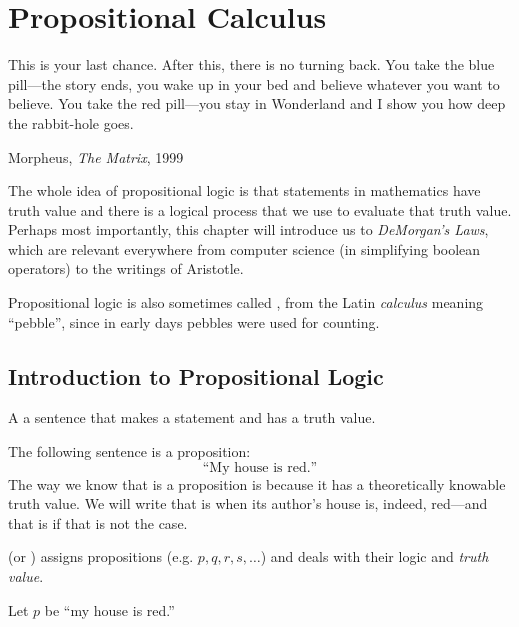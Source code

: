\chapter{Propositional Calculus}
\epigraph{This is your last chance. After this, there is no turning back. You
take the blue pill---the story ends, you wake up in your bed and believe
whatever you want to believe. You take the red pill---you stay in Wonderland and
I show you how deep the rabbit-hole goes.}{Morpheus, \emph{The Matrix}, 1999}
\label{ch:propositional}

The whole idea of propositional logic is that statements in mathematics have truth value and there is a logical process that we use to evaluate that truth value.
Perhaps most importantly, this chapter will introduce us to \emph{DeMorgan's Laws}, which are relevant everywhere from computer science (in simplifying boolean operators) to the writings of Aristotle.

\begin{remark}
Propositional logic is also sometimes called
,
from the Latin \emph{calculus} meaning ``pebble'', since in early days pebbles
were used for counting.\cite{wiktionary-calculus}
\end{remark}

\section{Introduction to Propositional Logic}
\label{sec:propintro}

\begin{defn}[proposition]
A  a sentence that makes a statement
and has a truth value.
\end{defn}

\begin{ex}
  The following sentence is a proposition:
  \begin{equation}
    \text{``My house is red.''}
    \label{eq:ex:proposition}
  \end{equation}
  The way we know that  is a proposition is because
  it has a theoretically knowable truth value.
  We will write that  is \ltrue{} when its author's
  house is, indeed, red---and that  is \lfalse{}
  if that is not the case.
\end{ex}

  (or )
  assigns propositions 
  (e.g. \(p, q, r, s, \ldots\))
  and deals with their logic and \emph{truth value}.
  \begin{ex}
    Let $p$ be ``my house is red.''
  \end{ex}

